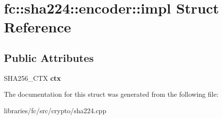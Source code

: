 \hypertarget{structfc_1_1sha224_1_1encoder_1_1impl}{}\section{fc\+:\+:sha224\+:\+:encoder\+:\+:impl Struct Reference}
\label{structfc_1_1sha224_1_1encoder_1_1impl}
\subsection*{Public Attributes}
\begin{DoxyCompactItemize}
\item 
\mbox{\label{structfc_1_1sha224_1_1encoder_1_1impl_ad5853b3c8ee1dc6aa5b03ffe2d4e9f14}} 
S\+H\+A256\+\_\+\+C\+TX {\bfseries ctx}
\end{DoxyCompactItemize}


The documentation for this struct was generated from the following file\+:\begin{DoxyCompactItemize}
\item 
libraries/fc/src/crypto/sha224.\+cpp\end{DoxyCompactItemize}
